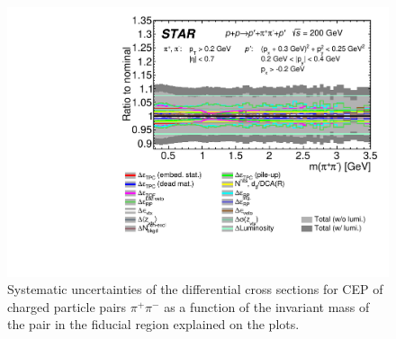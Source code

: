 \begin{figure}[h]
\centering
\includegraphics[width=.9\textwidth,page=1]{graphics/systematics/FinalResult_InvMass_pion_Systematics.pdf}
%
\caption{Systematic uncertainties of the differential cross sections for CEP of charged particle pairs $\pi^+\pi^-$ as a function of the invariant mass of the pair in the fiducial region explained on the plots.}
\label{systematics_01}
\end{figure}


